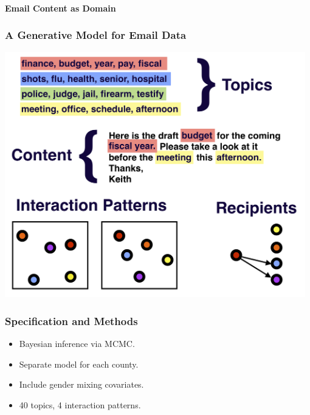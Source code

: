 \documentclass[xcolor={table}]{beamer}
\newenvironment{changemargin}[2]{%
  \begin{list}{}{%
    \setlength{\topsep}{0pt}%
    \setlength{\leftmargin}{#1}%
    \setlength{\rightmargin}{#2}%
    \setlength{\listparindent}{\parindent}%
    \setlength{\itemindent}{\parindent}%
    \setlength{\parsep}{\parskip}%
  }%
  \item[]}{\end{list}}
\begin{document}
\begin{frame}\frametitle{}
	\begin{center}
		\Huge\textbf{Email Content as Domain}
	\end{center}
\end{frame}


\begin{frame}\frametitle{A Generative Model for Email Data}
	\begin{changemargin}{-1cm}{ -1cm}
    \centering
	\includegraphics[width=0.98\textwidth]{images/Generative_Process.png}
	\end{changemargin} 
\end{frame}

\begin{frame}\frametitle{Specification and Methods}
	\LARGE
	\begin{itemize}
		\item Bayesian inference via MCMC.
		\vspace*{.4in}
		\item Separate model for each county.
		\vspace*{.4in}
		\item Include gender mixing covariates.
		\vspace*{.4in}
		\item 40 topics, 4 interaction patterns.
	\end{itemize}
\end{frame}
\end{document}
